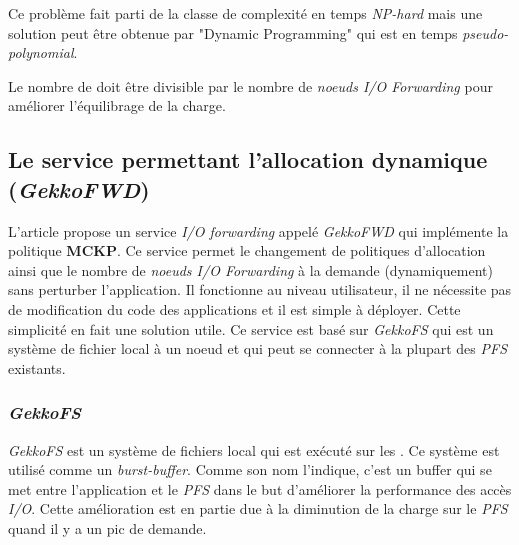 \documentclass[10pt, a4paper]{article}
\begin{document}
Ce problème fait parti de la classe de complexité en temps \emph{NP-hard} mais une solution peut être obtenue par "Dynamic Programming" qui est en temps \emph{pseudo-polynomial}.

Le nombre de \noeudsDeCalculs{} doit être divisible par le nombre de \emph{noeuds I/O Forwarding} pour améliorer l'équilibrage de la charge.


\subsection{Le service permettant l'allocation dynamique (\emph{GekkoFWD})}

L'article propose un service \emph{I/O forwarding} appelé \emph{GekkoFWD} qui implémente la politique \textbf{MCKP}. Ce service permet le changement de politiques d'allocation ainsi que le nombre de \emph{noeuds I/O Forwarding} à la demande (dynamiquement) sans perturber l'application. Il fonctionne au niveau utilisateur, il ne nécessite pas de modification du code des applications et il est simple à déployer. Cette simplicité en fait une solution utile.
Ce service est basé sur \emph{GekkoFS} qui est un système de fichier local à un noeud et qui peut se connecter à la plupart des \emph{PFS} existants.

\subsubsection{\emph{GekkoFS}}

\emph{GekkoFS} est un système de fichiers local qui est exécuté sur les \noeudsDeCalculs{}. Ce système est utilisé comme un \emph{burst-buffer}. Comme son nom l'indique, c'est un buffer qui se met entre l'application et le \emph{PFS} dans le but d'améliorer la performance des accès \emph{I/O}. Cette amélioration est en partie due à la diminution de la charge sur le \emph{PFS} quand il y a un pic de demande.
\end{document}
